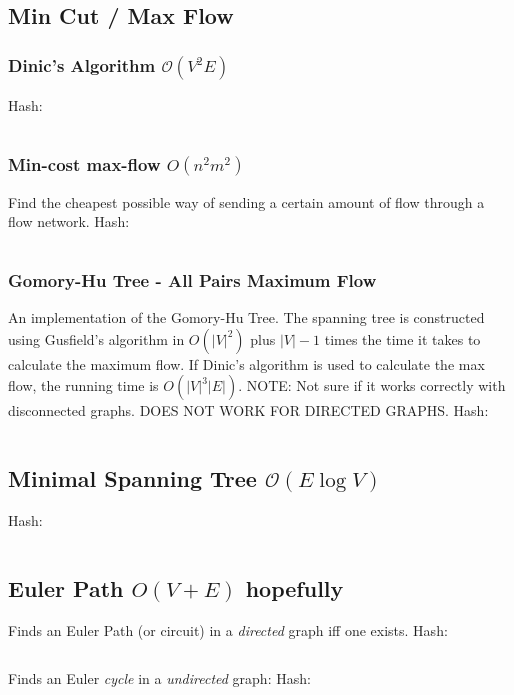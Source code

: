 \documentclass[9pt,a4paper,landscape,oneside]{amsart}
\newcommand{\mintedstyle}[2]{\inputminted{#1}{code/#2}}
\newcommand{\code}[1]{ Hash: 
\mintedstyle{cpp}{#1}}
\begin{document}
\begin{multicols*}{3}
\subsection{Min Cut / Max Flow}
\subsubsection{Dinic's Algorithm $\mathcal{O}(V^{2} E)$}
\code{graphs/dinic.cpp}

\subsubsection{Min-cost max-flow $O(n^2 m^2)$}
Find the cheapest possible way of sending a certain amount of flow through a flow network.
\code{graphs/mincostmaxflow.cpp}

\subsubsection{Gomory-Hu Tree - All Pairs Maximum Flow}
An implementation of the Gomory-Hu Tree. The spanning tree is constructed using Gusfield's algorithm
in $O(|V| ^ 2)$ plus $|V|-1$ times the time it takes to calculate the maximum flow.
If Dinic's algorithm is used to calculate the max flow, the running time is $O(|V|^3|E|)$.
NOTE: Not sure if it works correctly with disconnected graphs. DOES NOT WORK FOR DIRECTED GRAPHS.
\code{graphs/gomory_hu_tree.cpp}

\subsection{Minimal Spanning Tree $\mathcal{O}(E \log V)$}

\code{graphs/mst_kruskal.cpp}

\subsection{Euler Path $O(V+E)$ hopefully}
Finds an Euler Path (or circuit) in a \emph{directed} graph iff one exists.
\code{graphs/euler_path.cpp}
Finds an Euler \emph{cycle} in a \emph{undirected} graph:
\code{graphs/euler_path_undirected.cpp}


\end{multicols*}
\end{document}
